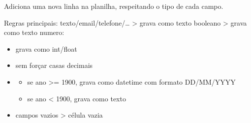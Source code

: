 \documentclass[letterpaper,10pt,english]{sphinxmanual}
\begin{document}
\begin{fulllineitems}
\label{\detokenize{api/excel_io:excel_io.append_row_typed}}
\pysigstartsignatures
\pysiglinewithargsret
{}
{\sphinxparamcomma {}\sphinxparamcomma {}\sphinxparamcomma {}}
{}
\pysigstopsignatures
\sphinxAtStartPar
Adiciona uma nova linha na planilha, respeitando o tipo de cada campo.

\sphinxAtStartPar
Regras principais:
\sphinxhyphen{} texto/email/telefone/… \sphinxhyphen{}\textgreater{} grava como texto
\sphinxhyphen{} booleano \sphinxhyphen{}\textgreater{} grava como texto
\sphinxhyphen{} numero:
\begin{itemize}
\item {} 
\sphinxAtStartPar
grava como int/float

\item {} 
\sphinxAtStartPar
sem forçar casas decimais

\end{itemize}
\begin{itemize}
\item {} \begin{description}
\begin{itemize}
\item {} 
\sphinxAtStartPar
se ano \textgreater{}= 1900, grava como datetime com formato DD/MM/YYYY

\item {} 
\sphinxAtStartPar
se ano \textless{} 1900, grava como texto

\end{itemize}

\end{description}

\item {} 
\sphinxAtStartPar
campos vazios \sphinxhyphen{}\textgreater{} célula vazia

\end{itemize}
\begin{quote}\begin{description}
\sphinxAtStartPar
{}

\end{description}\end{quote}

\end{fulllineitems}
\end{document}
